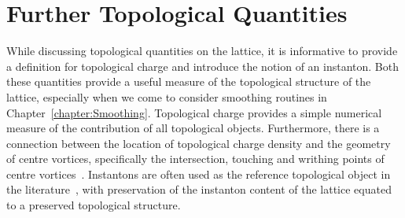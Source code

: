 \section{Further Topological Quantities}
While discussing topological quantities on the lattice, it is informative to provide a definition for topological charge and introduce the notion of an instanton. Both these quantities provide a useful measure of the topological structure of the lattice, especially when we come to consider smoothing routines in Chapter~\ref{chapter:Smoothing}. Topological charge provides a simple numerical measure of the contribution of all topological objects. Furthermore, there is a connection between the location of topological charge density and the geometry of centre vortices, specifically the intersection, touching and writhing points of centre vortices~\cite{Spengler:2018dxt,Reinhardt:2001kf}. Instantons are often used as the reference topological object in the literature~\cite{Moran:2008ra,Trewartha:2015ida}, with preservation of the instanton content of the lattice equated to a preserved topological structure.

